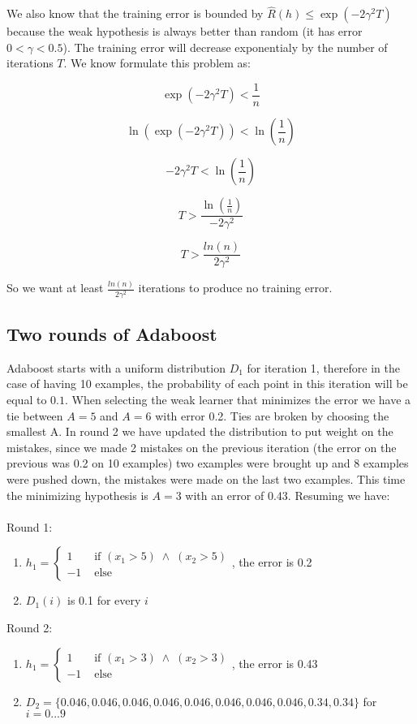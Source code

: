 \documentclass[11pt]{article}
\begin{document}
We also know that the training error is bounded by $\hat{R}(h) \leq  \exp(-2\gamma^{2}T)$ because the weak hypothesis is always better than random (it has error $0 < \gamma < 0.5$). The training error will decrease exponentialy by the number of iterations $T$. We know formulate this problem as:

$$\exp(-2\gamma^{2}T) < \frac{1}{n}$$

$$ \ln(\exp(-2\gamma^{2}T)) < \ln\left(\frac{1}{n}\right)$$

$$ -2\gamma^{2}T < \ln\left(\frac{1}{n}\right)$$

$$ T > \frac {\ln\left(\frac{1}{n}\right)}{-2\gamma^{2}}$$

$$ T > \frac {ln(n)}{2\gamma^{2}}$$

So we want at least $\frac {ln(n)}{2\gamma^{2}}$ iterations to produce no training error.


\subsection{Two rounds of Adaboost}

Adaboost starts with a uniform distribution $D_1$ for iteration 1, therefore in the case of having 10 examples, the probability of each point in this iteration will be equal to $0.1$. When selecting the weak learner that minimizes the error we have a tie between $A = 5$ and $A = 6$ with error 0.2. Ties are broken by choosing the smallest A. In round 2 we have updated the distribution to put weight on the mistakes, since we made 2 mistakes on the previous iteration (the error on the previous was 0.2 on 10 examples) two examples were brought up and 8 examples were pushed down, the mistakes were made on the last two examples. This time the minimizing hypothesis is $A = 3$ with an error of 0.43. Resuming we have:\\ \\
Round 1:
\begin{enumerate}
\item $h_1 = \begin{cases}
 1 & \text{ if } (x_{1} > 5) \; \land \; (x_{2}>5)  \\ 
 -1 & \text{ else} 
\end{cases}$, the error is 0.2
\item $D_{1}(i)$ is 0.1 for every $i$
\end{enumerate}
Round 2:
\begin{enumerate}
\item $h_1 = \begin{cases}
 1 & \text{ if } (x_{1} > 3) \; \land \; (x_{2}>3)  \\ 
 -1 & \text{ else} 
\end{cases}$, the error is 0.43
\item $D_{2} = \{0.046, 0.046, 0.046, 0.046, 0.046, 0.046, 0.046, 0.046, 0.34, 0.34\}$ for $i = 0 ... 9$
\end{enumerate}
\end{document}
